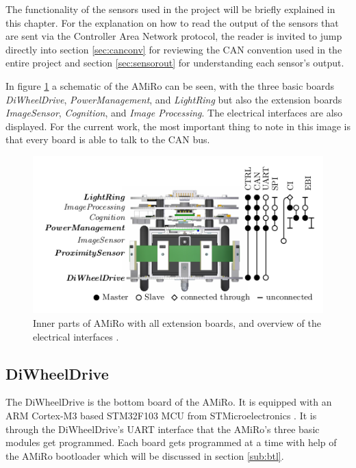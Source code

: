 \documentclass[12pt]{report}%
\begin{document}
The functionality of the sensors used in the project will be briefly explained in this chapter. For the explanation on how to read the output of the sensors that are sent via the Controller Area Network protocol, the reader is invited to jump directly into section \ref{sec:canconv} for reviewing the CAN convention used in the entire project and section \ref{sec:sensorout} for understanding each sensor's output.

In figure \ref{fig:schemat} a schematic of the AMiRo can be seen, with the three basic boards \textit{DiWheelDrive}, \textit{PowerManagement}, and \textit{LightRing} but also the extension boards \textit{ImageSensor}, \textit{Cognition}, and \textit{Image Processing}. The electrical interfaces are also displayed. For the current work, the most important thing to note in this image is that every board is able to talk to the CAN bus.

\begin{figure}[h]
	\centering
	\includegraphics[width=\textwidth]{amiro_schematic}
    \caption{Inner parts of AMiRo with all extension boards, and overview of the electrical interfaces \cite{AMiRo_paper_modular}.}
    \label{fig:schemat}
\end{figure}
\clearpage

\subsection{DiWheelDrive}
\label{sub:DWD}
The DiWheelDrive is the bottom board of the AMiRo. It is equipped with an ARM Cortex-M3 based STM32F103 MCU from STMicroelectronics \cite{AMiRo_paper_modular}. It is through the DiWheelDrive's UART interface that the AMiRo's three basic modules get programmed. Each board gets programmed at a time with help of the AMiRo bootloader which will be discussed in section \ref{sub:btl}.
\end{document}
